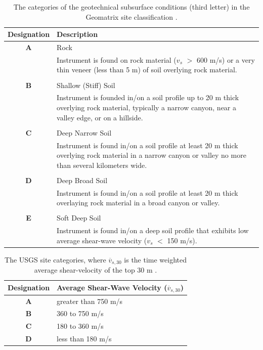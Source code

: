 \documentclass[12pt,oneside]{book}
\begin{document}
\begin{table}[tbp]
    \centering
    \begin{tabular}{cp{4in}}
        \hline\hline
        \textbf{Designation} & \textbf{Description} \\
        \hline
        \textbf{A} & Rock \\
                        & Instrument is found on rock material ($v_s$ $>$ 600 m/s) or a very thin veneer (less
        than 5 m) of soil overlying rock material.\\
        \\
        \textbf{B} & Shallow (Stiff) Soil \\
                        & Instrument is founded in/on a soil profile up to 20 m thick overlying rock
        material, typically a narrow canyon, near a valley edge, or on a hillside.\\
        \\
        \textbf{C} & Deep Narrow Soil \\
                        & Instrument is found in/on a soil profile at least 20 m thick overlying rock
        material in a narrow canyon or valley no more than several kilometers wide.\\
        \\
        \textbf{D} & Deep Broad Soil \\
                        & Instrument is found in/on a soil profile at least 20 m thick overlaying rock
        material in a broad canyon or valley.\\
        \\
        \textbf{E} & Soft Deep Soil \\
                        & Instrument is found in/on a deep soil profile that exhibits low average shear-wave
        velocity ($v_s$ $<$ 150 m/s).\\
        \hline\hline
    \end{tabular}
    \caption{The categories of the geotechnical subsurface conditions (third letter) in the Geomatrix
    site classification \citep{toro:95}.}
    \label{tab:rand:geomatrix}
\end{table}
\begin{table}[tbp]
    \centering
    \begin{tabular}{cl}
        \hline\hline
        \textbf{Designation} & \textbf{Average Shear-Wave Velocity} ($\overline{v}_{s,30}$)\\
        \hline
        \textbf{A} & greater than 750 m/s \\
        \textbf{B} & 360 to 750 m/s \\
        \textbf{C} & 180 to 360 m/s \\
        \textbf{D} & less than 180 m/s \\
        \hline\hline
    \end{tabular}
    \caption{The USGS site categories, where $\overline{v}_{s,30}$ is the time weighted average
    shear-velocity of the top 30 m \citep{toro:95}.}
    \label{tab:rand:usgs}
\end{table}
\end{document}
